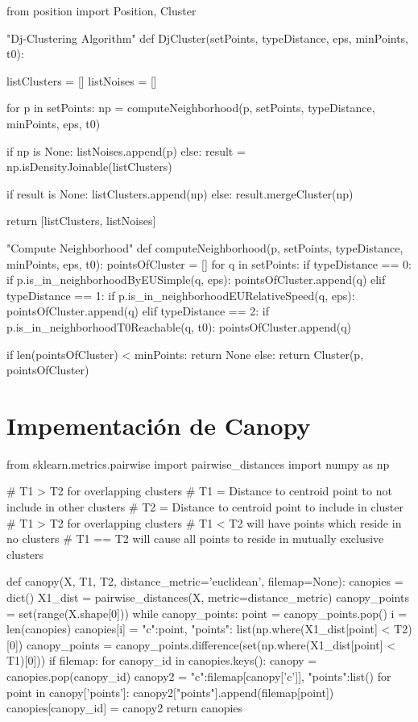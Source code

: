 \documentclass[a4paper, 12pt]{article}
\begin{document}
\begin{python}
from position import Position, Cluster

"Dj-Clustering Algorithm"
def DjCluster(setPoints, typeDistance, eps, minPoints, t0):

	listClusters = []
	listNoises = []

	for p in setPoints:
		np = computeNeighborhood(p, setPoints, typeDistance, minPoints, eps, t0)

		if np is None:
			listNoises.append(p) 
		else:
			result = np.isDensityJoinable(listClusters)

			if result is None:
				listClusters.append(np) 
			else:
				result.mergeCluster(np)

	return [listClusters, listNoises]

"Compute Neighborhood"
def computeNeighborhood(p, setPoints, typeDistance, minPoints, eps, t0):
	pointsOfCluster = []
	for q in setPoints:
		if typeDistance == 0:
			if p.is_in_neighborhoodByEUSimple(q, eps):
				pointsOfCluster.append(q)
		elif typeDistance == 1:
			if p.is_in_neighborhoodEURelativeSpeed(q, eps):
				pointsOfCluster.append(q)
		elif typeDistance == 2:
			if p.is_in_neighborhoodT0Reachable(q, t0):
				pointsOfCluster.append(q)

	if len(pointsOfCluster) < minPoints:
		return None
	else:
		return Cluster(p, pointsOfCluster)			

\end{python}

\newpage
\section{Impementaci\'on de Canopy} \label{App:AppendixD}

\begin{python}
from sklearn.metrics.pairwise import pairwise_distances
import numpy as np

# T1 > T2 for overlapping clusters
# T1 = Distance to centroid point to not include in other clusters
# T2 = Distance to centroid point to include in cluster
# T1 > T2 for overlapping clusters
# T1 < T2 will have points which reside in no clusters
# T1 == T2 will cause all points to reside in mutually exclusive clusters

def canopy(X, T1, T2, distance_metric='euclidean', filemap=None):
    canopies = dict()
    X1_dist = pairwise_distances(X, metric=distance_metric)
    canopy_points = set(range(X.shape[0]))
    while canopy_points:
        point = canopy_points.pop()
        i = len(canopies)
        canopies[i] = {"c":point, "points": list(np.where(X1_dist[point] < T2)[0])}
        canopy_points = canopy_points.difference(set(np.where(X1_dist[point] < T1)[0]))
    if filemap:
        for canopy_id in canopies.keys():
            canopy = canopies.pop(canopy_id)
            canopy2 = {"c":filemap[canopy['c']], "points":list()}
            for point in canopy['points']:
                canopy2["points"].append(filemap[point])
            canopies[canopy_id] = canopy2
    return canopies

\end{python}
\end{document}
